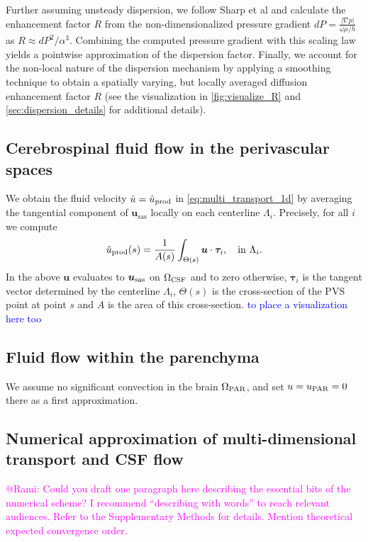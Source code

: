\documentclass[fleqn,10pt]{wlscirep}
\newcommand{\rami}[1]{\textcolor{blue}{#1}}
\newcommand{\mer}[1]{\textcolor{magenta}{#1}}
\begin{document}
Further assuming unsteady dispersion, we follow Sharp et al \cite{keith2019dispersion} and calculate the enhancement factor $R$ from the non-dimensionalized pressure gradient $dP=\frac{|\nabla p|}{\omega \mu / h}$ as $R\approx dP^2 / \alpha^3$. Combining the computed pressure gradient with this scaling law yields a pointwise approximation of the dispersion factor. Finally, we account for the non-local nature of the dispersion mechanism by applying a smoothing technique to obtain a spatially varying, but locally averaged diffusion enhancement factor $R$ (see the visualization in \cref{fig:visualize_R} and \cref{sec:dispersion_details} for additional details).


\subsection*{Cerebrospinal fluid flow in the perivascular spaces}
\label{sec:csf_pvs}
We obtain the fluid velocity $\hat u = \hat u_{\rm prod}$  in \eqref{eq:multi_transport_1d} by averaging the tangential component of $\bm u_{\mathrm{sas}}$ locally on each centerline $\Lambda_i$. Precisely, for all $i$ we compute 
\begin{equation}
\hat u_{\rm {prod}}(s) = \frac{1}{A(s)} \int_{\Theta(s)} \bm u \cdot \bm \tau_i, \quad \mathrm{in} \,\,  \Lambda_i.   
\end{equation}
 In the above $\bm u$ evaluates to $\bm u_{\rm{sas}}$ on $\Omega_{\rm CSF}$ and to zero otherwise, $\bm \tau_i$ is the tangent vector determined by the centerline $\Lambda_i$, $\Theta(s)$ is the cross-section of the PVS point at point $s$ and  $A$ is the area of this cross-section. \rami{to place a visualization here too }

\subsection*{Fluid flow within the parenchyma}
\label{sec:csf_brain}

We assume no significant convection in the brain $\Omega_{\rm PAR}$, and set $u = u_{\rm PAR} = 0$ there as a first approximation. 

\subsection*{Numerical approximation of multi-dimensional transport and CSF flow}

\mer{@Rami: Could you draft one paragraph here describing the essential bits of the numerical scheme? I recommend ``describing with words'' to reach relevant audiences. Refer to the Supplementary Methods for details. Mention theoretical expected convergence order.} 
\end{document}
